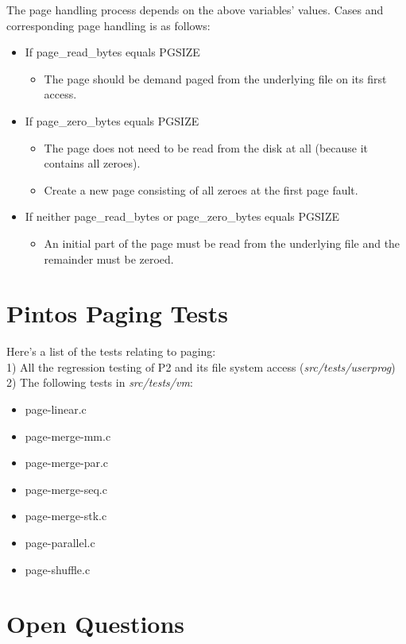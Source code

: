 \documentclass[11pt, letterpaper]{article}
\begin{document}
    The page handling process depends on the above variables’ values. Cases and 
corresponding page handling is as follows:

\begin{itemize}
\item If page\_read\_bytes equals PGSIZE
	\begin{itemize}
		\item The page should be demand paged from the underlying file on its first access.
	\end{itemize}
\item If page\_zero\_bytes equals PGSIZE
	\begin{itemize}
		\item The page does not need to be read from the disk at all (because it contains all zeroes).
		\item Create a new page consisting of all zeroes at the first page fault.
	\end{itemize}
\item If neither page\_read\_bytes or page\_zero\_bytes equals PGSIZE
	\begin{itemize}
		\item An initial part of the page must be read from the underlying file and the remainder must be 				  zeroed.
	\end{itemize}
\end{itemize}

\section{Pintos Paging Tests}
Here's a list of the tests relating to paging:
\\1) All the regression testing of P2 and its file system access (\emph{src/tests/userprog})
\\2) The following tests in \emph{src/tests/vm}:
	\begin{itemize}
		\item page-linear.c
		\item page-merge-mm.c
		\item page-merge-par.c
		\item page-merge-seq.c
		\item page-merge-stk.c
		\item page-parallel.c
		\item page-shuffle.c
	\end{itemize}
	
\section*{Open Questions}
\end{document}
